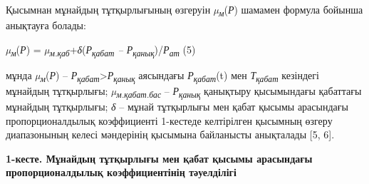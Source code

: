Қысымнан мұнайдың тұтқырлығының өзгеруін
\emph{µ\textsubscript{м}}(\emph{Р}) шамамен формула бойынша анықтауға
болады:

\emph{µ\textsubscript{м}}(\emph{Р}) =
\emph{µ\textsubscript{м.қаб}}+\emph{δ}(\emph{Р\textsubscript{қабат} --
Р\textsubscript{қанық}})/\emph{Р\textsubscript{ат}} (5)

мұнда \emph{µ\textsubscript{м}}(\emph{Р}) --
\emph{Р\textsubscript{қабат}}\textgreater{}\emph{Р\textsubscript{қанық}}
аясындағы \emph{Р\textsubscript{қабат}}(t) мен
\emph{Т\textsubscript{қабат}} кезіндегі мұнайдың тұтқырлығы;
\emph{µ\textsubscript{м.қабат.бас }}-- \emph{Р\textsubscript{қанық}}
қанықтыру қысымындағы қабаттағы мұнайдың тұтқырлығы; \emph{δ} -- мұнай
тұтқырлығы мен қабат қысымы арасындағы пропорционалдылық коэффициенті
1-кестеде келтірілген қысымның өзгеру диапазонының келесі мәндерінің
қысымына байланысты анықталады {[}5, 6{]}.

{\bfseries 1-кесте. Мұнайдың тұтқырлығы мен қабат қысымы арасындағы
пропорционалдылық коэффициентінің тәуелділігі}

